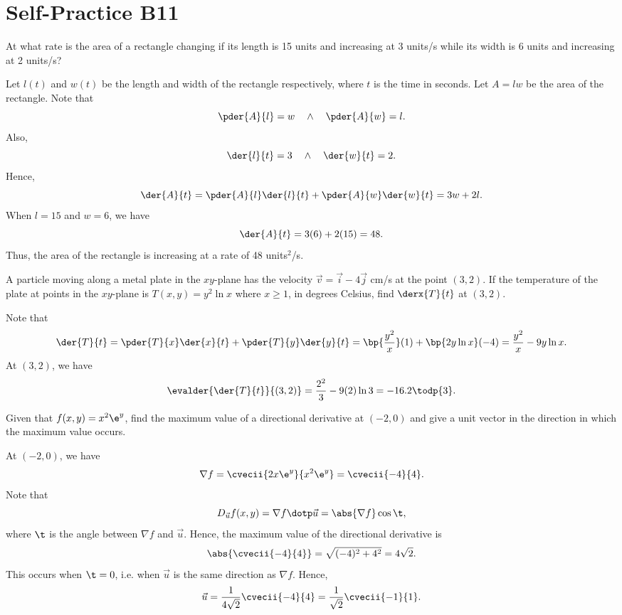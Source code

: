 \section{Self-Practice B11}

\begin{problem}
    At what rate is the area of a rectangle changing if its length is 15 units and increasing at 3 units/s while its width is 6 units and increasing at 2 units/s?
\end{problem}
\begin{solution}
    Let $l(t)$ and $w(t)$ be the length and width of the rectangle respectively, where $t$ is the time in seconds. Let $A = lw$ be the area of the rectangle. Note that \[\pder{A}{l} = w \quad \land \quad \pder{A}{w} = l.\] Also, \[\der{l}{t} = 3 \quad \land \quad \der{w}{t} = 2.\] Hence, \[\der{A}{t} = \pder{A}{l} \der{l}{t} + \pder{A}{w} \der{w}{t} = 3w + 2l.\] When $l = 15$ and $w = 6$, we have \[\der{A}{t} = 3(6) + 2(15) = 48.\] Thus, the area of the rectangle is increasing at a rate of 48 units$^2$/s.
\end{solution}

\begin{problem}
    A particle moving along a metal plate in the $xy$-plane has the velocity $\vec v = \vec i - 4 \vec j$ cm/s at the point $(3, 2)$. If the temperature of the plate at points in the $xy$-plane is $T(x, y) = y^2 \ln x$ where $x \geq 1$, in degrees Celsius, find $\derx{T}{t}$ at $(3, 2)$.
\end{problem}
\begin{solution}
    Note that \[\der{T}{t} = \pder{T}{x} \der{x}{t} + \pder{T}{y} \der{y}{t} = \bp{\frac{y^2}{x}} (1) + \bp{2y \ln x} (-4) = \frac{y^2}{x} - 9y \ln x.\] At $(3, 2)$, we have \[\evalder{\der{T}{t}}{(3, 2)} = \frac{2^2}{3} - 9(2) \ln 3 = -16.2 \todp{3}.\]
\end{solution}

\begin{problem}
    Given that $f(x, y) = x^2 \e^y$, find the maximum value of a directional derivative at $(-2, 0)$ and give a unit vector in the direction in which the maximum value occurs.
\end{problem}
\begin{solution}
    At $(-2, 0)$, we have \[\nabla f = \cvecii{2x \e^y}{x^2 \e^y} = \cvecii{-4}{4}.\] Note that \[D_{\vec u} f(x, y) = \nabla f \dotp \vec u = \abs{\nabla f} \cos \t,\] where $\t$ is the angle between $\nabla f$ and $\vec u$. Hence, the maximum value of the directional derivative is \[\abs{\cvecii{-4}{4}} = \sqrt{(-4)^2 + 4^2} = 4\sqrt{2}.\] This occurs when $\t = 0$, i.e. when $\vec u$ is the same direction as $\nabla f$. Hence, \[\vec u = \frac1{4\sqrt{2}} \cvecii{-4}{4} = \frac1{\sqrt2} \cvecii{-1}{1}.\]
\end{solution}

